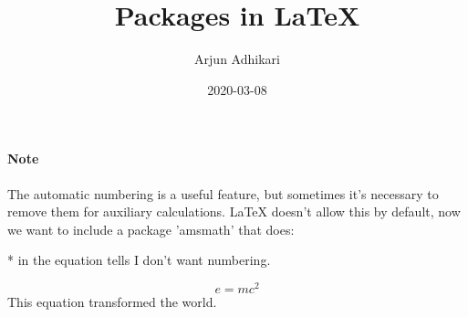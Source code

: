\documentclass{article}
\title{Packages in  LaTeX}
\author{Arjun Adhikari}
\date{2020-03-08}
\begin{document}
	\maketitle
	\newpage
	
	\paragraph{Note}
	The automatic numbering is a useful feature, but sometimes it's necessary to remove them for auxiliary calculations. LaTeX doesn't allow this by default, now we want to include a package 'amsmath' that does:
	
	
	* in the equation tells I don't want numbering.
	
	\begin{equation*}
		e = mc ^ 2
	\end{equation*}
	This equation transformed the world.
	
	
\end{document}
